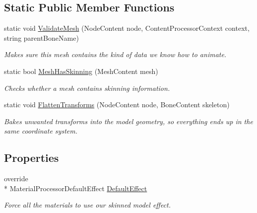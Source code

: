 \subsection*{Static Public Member Functions}
\begin{DoxyCompactItemize}
\item 
static void \hyperlink{class_microsoft_1_1_samples_1_1_kinect_1_1_skinned_model_pipeline_1_1_skinned_model_processor_a15a7a2a1007a8f815f46cd260558b004}{Validate\+Mesh} (Node\+Content node, Content\+Processor\+Context context, string parent\+Bone\+Name)
\begin{DoxyCompactList}\small\item\em Makes sure this mesh contains the kind of data we know how to animate. \end{DoxyCompactList}\item 
static bool \hyperlink{class_microsoft_1_1_samples_1_1_kinect_1_1_skinned_model_pipeline_1_1_skinned_model_processor_a1d13d928dfa3c2ed9a5c9eaa115a0b18}{Mesh\+Has\+Skinning} (Mesh\+Content mesh)
\begin{DoxyCompactList}\small\item\em Checks whether a mesh contains skinning information. \end{DoxyCompactList}\item 
static void \hyperlink{class_microsoft_1_1_samples_1_1_kinect_1_1_skinned_model_pipeline_1_1_skinned_model_processor_a788feaa714f2e3afceb45de2e265b4f5}{Flatten\+Transforms} (Node\+Content node, Bone\+Content skeleton)
\begin{DoxyCompactList}\small\item\em Bakes unwanted transforms into the model geometry, so everything ends up in the same coordinate system. \end{DoxyCompactList}\end{DoxyCompactItemize}
\subsection*{Properties}
\begin{DoxyCompactItemize}
\item 
override \\*
Material\+Processor\+Default\+Effect \hyperlink{class_microsoft_1_1_samples_1_1_kinect_1_1_skinned_model_pipeline_1_1_skinned_model_processor_a15f28361f1525eae7c96ddb05a290a2d}{Default\+Effect}
\begin{DoxyCompactList}\small\item\em Force all the materials to use our skinned model effect. \end{DoxyCompactList}\end{DoxyCompactItemize}



